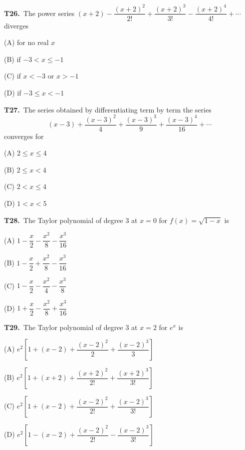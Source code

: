 \documentclass[11pt]{article}
\begin{document}
\bigskip\noindent\textbf{T26.}\ The power series $(x+2)-\dfrac{(x+2)^2}{2!}+\dfrac{(x+2)^3}{3!}-\dfrac{(x+2)^4}{4!}+\cdots$ diverges
\begin{list}{}{\setlength{\leftmargin}{3em}\setlength{\labelwidth}{2.5em}\setlength{\itemsep}{0pt}\setlength{\topsep}{2pt}}
\item[(A)] for no real $x$
\item[(B)] if $-3<x\leq -1$
\item[(C)] if $x<-3$ or $x>-1$
\item[(D)] if $-3\leq x<-1$
\end{list}

\bigskip\noindent\textbf{T27.}\ The series obtained by differentiating term by term the series
\[
(x-3)+\dfrac{(x-3)^2}{4}+\dfrac{(x-3)^3}{9}+\dfrac{(x-3)^4}{16}+\cdots
\]
converges for
\begin{list}{}{\setlength{\leftmargin}{3em}\setlength{\labelwidth}{2.5em}\setlength{\itemsep}{0pt}\setlength{\topsep}{2pt}}
\item[(A)] $2\leq x\leq 4$
\item[(B)] $2\leq x<4$
\item[(C)] $2<x\leq 4$
\item[(D)] $1<x<5$
\end{list}

\bigskip\noindent\textbf{T28.}\ The Taylor polynomial of degree 3 at $x=0$ for $f(x)=\sqrt{1-x}$ is
\begin{list}{}{\setlength{\leftmargin}{3em}\setlength{\labelwidth}{2.5em}\setlength{\itemsep}{0pt}\setlength{\topsep}{2pt}}
\item[(A)] $1-\dfrac{x}{2}-\dfrac{x^2}{8}-\dfrac{x^3}{16}$
\item[(B)] $1-\dfrac{x}{2}+\dfrac{x^2}{8}-\dfrac{x^3}{16}$
\item[(C)] $1-\dfrac{x}{2}-\dfrac{x^2}{4}-\dfrac{x^3}{8}$
\item[(D)] $1+\dfrac{x}{2}-\dfrac{x^2}{8}+\dfrac{x^3}{16}$
\end{list}

\bigskip\noindent\textbf{T29.}\ The Taylor polynomial of degree 3 at $x=2$ for $e^x$ is
\begin{list}{}{\setlength{\leftmargin}{3em}\setlength{\labelwidth}{2.5em}\setlength{\itemsep}{0pt}\setlength{\topsep}{2pt}}
\item[(A)] $e^2\left[1+(x-2)+\dfrac{(x-2)^2}{2}+\dfrac{(x-2)^3}{3}\right]$
\item[(B)] $e^2\left[1+(x+2)+\dfrac{(x+2)^2}{2!}+\dfrac{(x+2)^3}{3!}\right]$
\item[(C)] $e^2\left[1+(x-2)+\dfrac{(x-2)^2}{2!}+\dfrac{(x-2)^3}{3!}\right]$
\item[(D)] $e^2\left[1-(x-2)+\dfrac{(x-2)^2}{2!}-\dfrac{(x-2)^3}{3!}\right]$
\end{list}
\end{document}
